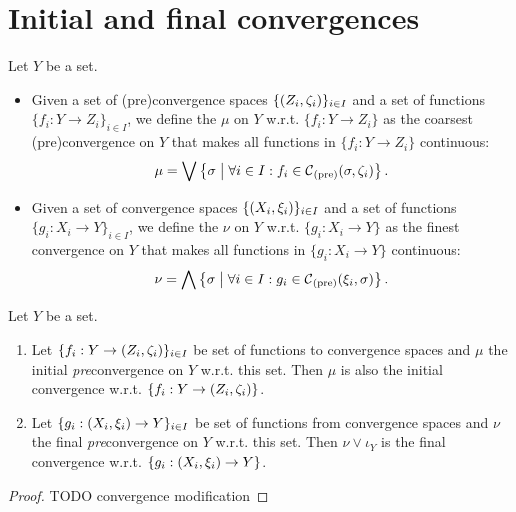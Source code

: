 \section{Initial and final convergences}
\begin{definition}
Let $Y$ be a set.
\begin{itemize}
\item Given a set of (pre)convergence spaces $\{\left( Z_i,\zeta_i \right)\}_{i\in I}$ and a set of functions $\{f_i: Y\to Z_i\}_{i\in I}$, we define the  $\mu$ on $Y$ w.r.t. $\{f_i: Y\to Z_i\}$ as the coarsest (pre)convergence on $Y$ that makes all functions in $\{f_i: Y\to Z_i\}$ continuous:
\[ \mu = \bigvee \left\{ \sigma \;\middle|\; \forall i\in I: f_i\in  \operatorname{\mathcal{C}}_\text{(pre)}(\sigma, \zeta_i) \right\}. \]
\item Given a set of convergence spaces $\{\left( X_i,\xi_i \right)\}_{i\in I}$ and a set of functions $\{g_i: X_i \to Y\}_{i\in I}$, we define the  $\nu$ on $Y$ w.r.t. $\{g_i: X_i\to Y\}$ as the finest convergence on $Y$ that makes all functions in $\{g_i: X_i \to Y\}$ continuous:
\[ \nu = \bigwedge \left\{ \sigma \;\middle|\; \forall i\in I: g_i\in  \operatorname{\mathcal{C}}_\text{(pre)}(\xi_i, \sigma) \right\}. \]
\end{itemize}
\end{definition}

\begin{proposition} \label{initialFinalConvergenceModification}
Let $Y$ be a set.
\begin{enumerate}
\item Let $\{f_i: Y\to \left( Z_i, \zeta_i \right)\}_{i\in I}$ be set of functions to convergence spaces and $\mu$ the initial \emph{pre}convergence on $Y$ w.r.t. this set. Then $\mu$ is also the initial convergence w.r.t. $\{f_i: Y\to \left( Z_i, \zeta_i \right)\}$.
\item Let $\{g_i: \left( X_i, \xi_i \right) \to Y\}_{i\in I}$ be set of functions from convergence spaces and $\nu$ the final \emph{pre}convergence on $Y$ w.r.t. this set. Then $\nu \vee \iota_Y$ is the final convergence w.r.t. $\{g_i: \left( X_i, \xi_i \right) \to Y\}$.
\end{enumerate}
\end{proposition}
\begin{proof}
TODO convergence modification
\end{proof}

